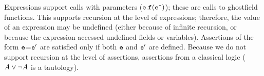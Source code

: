  
Expressions support calls with parameters  (${\mbox{\tt{e}}}.{\mbox{\tt{f}}}({\mbox{\tt{e}}}^*)$); these are calls to ghostfield
functions. This  supports recursion at the level of expressions; therefore, the value of  an expression  may be
undefined (either because of infinite recursion, or because the expression accessed undefined fields or variables). 
Assertions of the form   ${\mbox{\tt{e}}}$=${\mbox{\tt{e}}}'$ are satisfied only if both ${\mbox{\tt{e}}}$ and ${\mbox{\tt{e}}}'$ are defined. Because we do not support 
recursion at the level of assertions, assertions from a classical logic (\eg $A \vee \neg A$ is a tautology).
 
